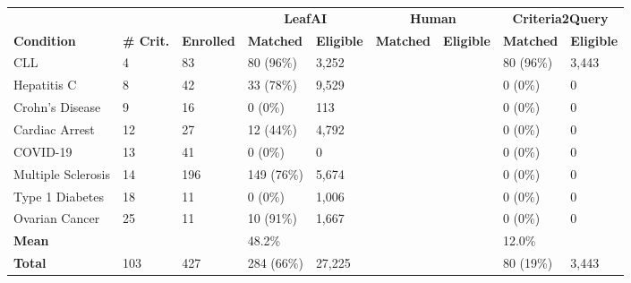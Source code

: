 \def\arraystretch{1.4}
\begin{tabular}{m{3cm} m{1.3cm} m{1.5cm} |m{1.7cm} m{1.3cm} |m{1.7cm} m{1.3cm} |m{1.7cm} m{1.3cm}}
    \toprule
     & & & \multicolumn{2}{c}{\textbf{LeafAI}} & \multicolumn{2}{|c|}{\textbf{Human}} & \multicolumn{2}{c}{\textbf{Criteria2Query}}  \\
    \textbf{Condition} & \textbf{\# Crit.} & \textbf{Enrolled} & \textbf{Matched} & \textbf{Eligible} & \textbf{Matched} & \textbf{Eligible} & \textbf{Matched} & \textbf{Eligible} \\
    \midrule
    CLL                & 4 & 83 & 80 (96\%) & 3,252 & & & 80 (96\%) & 3,443 \\
    Hepatitis C        & 8 & 42 & 33 (78\%) & 9,529 & & & 0 (0\%) & 0 \\
    Crohn's Disease    & 9 & 16 & 0 (0\%) & 113 & & & 0 (0\%) & 0 \\
    Cardiac Arrest     & 12 & 27 & 12 (44\%) & 4,792 & & & 0 (0\%) & 0 \\
    COVID-19           & 13 & 41 & 0 (0\%) & 0 & & & 0 (0\%) & 0 \\
    Multiple Sclerosis & 14 & 196 & 149 (76\%) & 5,674 & & & 0 (0\%) & 0 \\
    Type 1 Diabetes    & 18 & 11  & 0 (0\%)      & 1,006 & & & 0 (0\%) & 0 \\
    Ovarian Cancer     & 25 & 11 & 10 (91\%) & 1,667 & & & 0 (0\%) & 0  \\
    \bottomrule
    \textbf{Mean} & & & 48.2\% & & & & 12.0\% &  \\
    \textbf{Total} & 103 & 427 & 284 (66\%) & 27,225 & & & 80 (19\%) & 3,443 \\
\end{tabular}